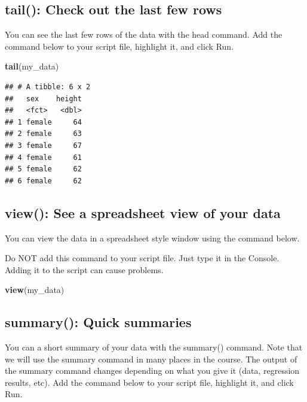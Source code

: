 \documentclass[
]{krantz}
\makeatletter
\newenvironment{Shaded}{\begin{snugshade}}{\end{snugshade}}
\newcommand{\KeywordTok}[1]{\textcolor[rgb]{0.27,0.27,0.27}{\textbf{#1}}}
\newcommand{\NormalTok}[1]{#1}
\newenvironment{kframe}{%
\medskip{}
\setlength{\fboxsep}{.8em}
 \def\at@end@of@kframe{}%
 \ifinner\ifhmode%
  \def\at@end@of@kframe{\end{minipage}}%
  \begin{minipage}{\columnwidth}%
 \fi\fi%
 \def\FrameCommand##1{\hskip\@totalleftmargin \hskip-\fboxsep
 \colorbox{shadecolor}{##1}\hskip-\fboxsep
     \hskip-\linewidth \hskip-\@totalleftmargin \hskip\columnwidth}%
 \MakeFramed {\advance\hsize-\width
   \@totalleftmargin\z@ \linewidth\hsize
   \@setminipage}}%
 {\par\unskip\endMakeFramed%
 \at@end@of@kframe}
\renewenvironment{Shaded}{\begin{kframe}}{\end{kframe}}
\makeatother
\begin{document}
\hypertarget{tail-check-out-the-last-few-rows}{%
\subsection{tail(): Check out the last few rows}\label{tail-check-out-the-last-few-rows}}

You can see the last few rows of the data with the head command. Add the command below to your script file, highlight it, and click Run.

\begin{Shaded}
\begin{Highlighting}[]
\KeywordTok{tail}\NormalTok{(my_data)}
\end{Highlighting}
\end{Shaded}

\begin{verbatim}
## # A tibble: 6 x 2
##   sex    height
##   <fct>   <dbl>
## 1 female     64
## 2 female     63
## 3 female     67
## 4 female     61
## 5 female     62
## 6 female     62
\end{verbatim}

\hypertarget{view-see-a-spreadsheet-view-of-your-data}{%
\subsection{view(): See a spreadsheet view of your data}\label{view-see-a-spreadsheet-view-of-your-data}}

You can view the data in a spreadsheet style window using the command below.

Do NOT add this command to your script file. Just type it in the Console. Adding it to the script can cause problems.

\begin{Shaded}
\begin{Highlighting}[]
\KeywordTok{view}\NormalTok{(my_data)}
\end{Highlighting}
\end{Shaded}

\hypertarget{summary-quick-summaries}{%
\subsection{summary(): Quick summaries}\label{summary-quick-summaries}}

You can a short summary of your data with the summary() command. Note that we will use the summary command in many places in the course. The output of the summary command changes depending on what you give it (data, regression results, etc). Add the command below to your script file, highlight it, and click Run.
\end{document}
